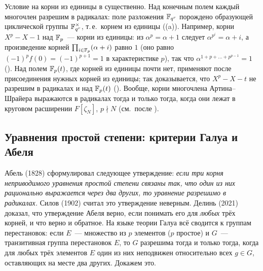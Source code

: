 \begin{center}
\begin{keepfig}
\centering
{}
\end{keepfig}
\end{center}

Условие на корни из единицы в  существенно. Над конечным полем каждый многочлен разрешим в радикалах: поле
разложения $\mathbb F_{q^r}$ порождено образующей циклической группы $\mathbb F_{q^r}^\times$, т.\,е.\ корнем из единицы ((a)). Например,
корни $X^p-X-1$ над $\mathbb F_p$~--- корни из единицы: из $\alpha^p=\alpha+1$ следует $\alpha^{p^i}=\alpha+i$, а произведение
корней $\prod_{i\in\mathbb F_p}(\alpha+i)$ равно $1$ (оно равно $(-1)^p f(0)=(-1)^{p+1}=1$ в характеристике $p$), так что
$\alpha^{1+p+\dots+p^{p-1}}=1$ (). Над полем $\mathbb F_p(t)$, где корней из единицы почти нет,  применяют после
присоединения нужных корней из единицы; так доказывается, что $X^p-X-t$ не разрешим в радикалах и над $\mathbb F_p(t)$ ().
Вообще, корни многочлена Артина--Шрайера выражаются в радикалах тогда и только тогда, когда они лежат в круговом
расширении $F[\zeta_N]$, $p\nmid N$ (см.\ после ).

\subsection*{Уравнения простой степени: критерии Галуа и Абеля}

\begin{aside}[3.30]
Абель (1828) сформулировал следующее утверждение: \emph{если три корня неприводимого уравнения простой степени связаны
так, что один из них рационально выражается через два других, то уравнение разрешимо в радикалах.} Силов (1902) считал
это утверждение неверным. Делинь (2021) доказал, что утверждение Абеля верно, если
понимать его для \emph{любых} трёх корней, и что верно и обратное. На языке теории Галуа всё сводится к группам перестановок: если $E$~---
множество из $p$ элементов ($p$ простое) и $G$~--- транзитивная группа перестановок $E$, то $G$ разрешима тогда и только
тогда, когда для любых трёх элементов $E$ один из них неподвижен относительно всех $g\in G$, оставляющих на месте два
других. Докажем это.
\end{aside}

